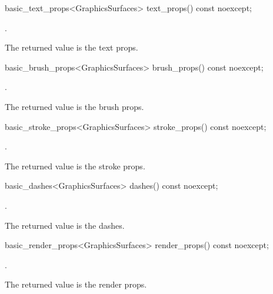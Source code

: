 %
\begin{itemdecl}
basic_text_props<GraphicsSurfaces> text_props() const noexcept;
\end{itemdecl}
\begin{itemdescr}
\pnum
\returns {}.

\pnum
\remarks The returned value is the text props.
\end{itemdescr}

%
\begin{itemdecl}
basic_brush_props<GraphicsSurfaces> brush_props() const noexcept;
\end{itemdecl}
\begin{itemdescr}
\pnum
\returns {}.

\pnum
\remarks The returned value is the brush props.
\end{itemdescr}

%
\begin{itemdecl}
basic_stroke_props<GraphicsSurfaces> stroke_props() const noexcept;
\end{itemdecl}
\begin{itemdescr}
\pnum
\returns {}.

\pnum
\remarks The returned value is the stroke props.
\end{itemdescr}

%
\begin{itemdecl}
basic_dashes<GraphicsSurfaces> dashes() const noexcept;
\end{itemdecl}
\begin{itemdescr}
\pnum
\returns {}.

\pnum
\remarks The returned value is the dashes.
\end{itemdescr}

%
\begin{itemdecl}
basic_render_props<GraphicsSurfaces> render_props() const noexcept;
\end{itemdecl}
\begin{itemdescr}
\pnum
\returns {}.

\pnum
\remarks The returned value is the render props.
\end{itemdescr}

